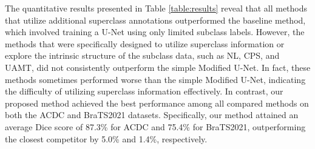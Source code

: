 \documentclass[runningheads]{llncs}
\begin{document}
\par The quantitative results presented in Table \ref{table:results} reveal that all methods that utilize additional superclass annotations outperformed the baseline method, which involved training a U-Net using only limited subclass labels. However, the methods that were specifically designed to utilize superclass information or explore the intrinsic structure of the subclass data, such as NL, CPS, and UAMT, did not consistently outperform the simple Modified U-Net. In fact, these methods sometimes performed worse than the simple Modified U-Net, indicating the difficulty of utilizing superclass information effectively. In contrast, our proposed method achieved the best performance among all compared methods on both the ACDC and BraTS2021 datasets. Specifically, our method attained an average Dice score of 87.3\% for ACDC and 75.4\% for BraTS2021, outperforming the closest competitor by 5.0\% and 1.4\%, respectively.
\end{document}
